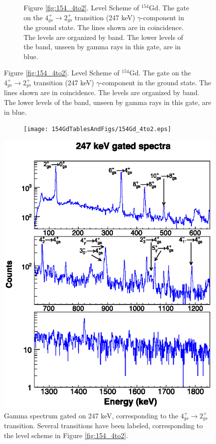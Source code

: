 \begin{landscape}
\begin{figure}[!]
    \centering
    \label{fig:154_4to2}
    \begin{subfigure}{1.4\textwidth}
    \caption*{\centering \fontsize{10pt}{12pt}Figure \ref{fig:154_4to2}. Level Scheme of $^{154}$Gd. The gate on the $4_{gs}^+\rightarrow 2_{gs}^+$ transition (247 keV) $\gamma$-component in the ground state. The lines shown are in coincidence. The levels are organized by band. The lower levels of the band, unseen by gamma rays in this gate, are in blue. }
    \end{subfigure}
\end{figure}
\clearpage
\begin{figure}
    \ContinuedFloat
    \begin{subfigure}{1.4\textwidth}
    \texttt{[image: 154GdTablesAndFigs/154Gd\_4to2.eps]}
    \label{fig:154_4to2level}
    \end{subfigure}
\end{figure}
\end{landscape}
\begin{figure}
    \includegraphics[scale=1.3]{154GdTablesAndFigs/247_gamma.eps}
    \caption{Gamma spectrum gated on 247 keV, corresponding to the $4_{gs}^+\rightarrow 2_{gs}^+$ transition. Several transitions have been labeled, corresponding to the level scheme in Figure \ref{fig:154_4to2}.}
    \label{fig:154_4to2spec}
\end{figure}